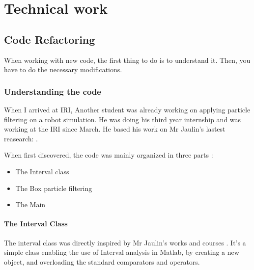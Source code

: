 \chapter{Technical work}

\label{technic}







\section{Code Refactoring}
When working with new code, the first thing to do is to understand it. Then, you have to do the necessary modifications.
\subsection{Understanding the code}
When I arrived at IRI, Another student was already working on applying particle filtering on a robot simulation.
He was doing his third year internship and was working at the IRI since March. He based his work on Mr Jaulin's lastest reasearch: \parencite{Base}.

When first discovered, the code was mainly organized in three parts :
\begin{itemize}
  \item The Interval class
  \item The Box particle filtering
  \item The Main
\end{itemize}
\subsubsection{The Interval Class}
The interval class was directly inspired by Mr Jaulin's works and courses \parencite{IAMOOC}.
It's a simple class enabling the use of Interval analysis in Matlab, by creating a new object, and overloading the standard comparators and operators.\\

